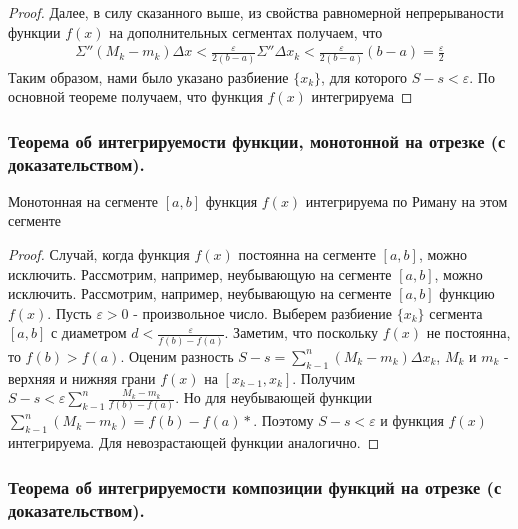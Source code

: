 \documentclass[10pt]{article}
\begin{document}
\begin{proof}
        Далее, в силу сказанного выше, из свойства равномерной непрерываности функции $f(x)$ на дополнительных сегментах получаем, что
        \begin{gather*}
            \Sigma'' (M_k - m_k) \Delta x < \frac{\varepsilon}{2(b-a)} \Sigma'' \Delta x_k < \frac{\varepsilon}{2(b-a)}(b-a) = \frac{\varepsilon}{2}
        \end{gather*}
        Таким образом, нами было указано разбиение $\{x_k\}$, для которого $S-s<\varepsilon$. По основной теореме получаем, что функция $f(x)$ интегрируема
    \end{proof}



    \subsubsection{Теорема об интегрируемости функции, монотонной на отрезке (с доказательством).}
    \begin{theorem}
        Монотонная на сегменте $[a, b]$ функция $f(x)$ интегрируема по Риману на этом сегменте
    \end{theorem}
    \begin{proof}
        Случай, когда функция $f(x)$ постоянна на сегменте $[a, b]$, можно исключить. Рассмотрим, например, неубывающую на сегменте $[a, b]$, можно исключить. Рассмотрим, например, неубывающую на сегменте $[a, b]$ функцию $f(x)$. Пусть $\varepsilon > 0$ - произвольное число. Выберем разбиение $\{x_k\}$ сегмента $[a, b]$ с диаметром $d < \frac{\varepsilon}{f(b)-f(a)}$. Заметим, что поскольку $f(x)$ не постоянна, то $f(b) > f(a)$. Оценим разность $S-s = \sum_{k-1}^n (M_k - m_k) \Delta x_k$, $M_k$ и $m_k$ - верхняя и нижняя грани $f(x)$ на $[x_{k-1}, x_k]$. Получим $S - s < \varepsilon \sum_{k-1}^n \frac{M_k - m_k}{f(b) - f(a)}$. Но для неубывающей функции $\sum_{k-1}^n (M_k - m_k) = f(b) - f(a)*$. Поэтому $S - s < \varepsilon$ и функция $f(x)$ интегрируема. Для невозрастающей функции аналогично.
    \end{proof}



    \subsubsection{Теорема об интегрируемости композиции функций на отрезке (с доказательством).}
\end{document}
